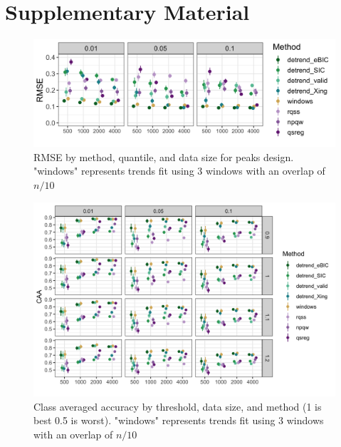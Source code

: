 \documentclass[12pt]{article}
\begin{document}
\section*{Supplementary Material}	 
	
\begin{figure}[h!]
	\includegraphics[width = \linewidth]{Figures/peaks_with_windows_mse.png}
	\caption{RMSE by method, quantile, and data size for peaks design. "windows" represents trends fit using 3 windows with an overlap of $n/10$}
	\label{fig:peaks_rmse}
\end{figure}

\begin{figure}[h!]
	\includegraphics[width = \linewidth]{Figures/peaks_with_windows_CAA.png}
	\caption{Class averaged accuracy by threshold, data size, and method (1 is best 0.5 is worst). "windows" represents trends fit using 3 windows with an overlap of $n/10$}
	\label{fig:CAA}
\end{figure}
\end{document}
